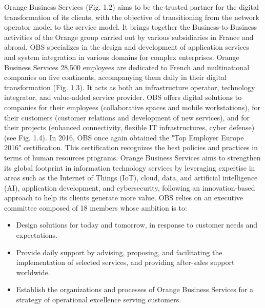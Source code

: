 Orange Business Services (Fig. 1.2) aims to be the trusted partner for the digital transformation of its clients, with the objective of transitioning from the network operator model to the service model. It brings together the Business-to-Business activities of the Orange group carried out by various subsidiaries in France and abroad. OBS specializes in the design and development of application services and system integration in various domains for complex enterprises. Orange Business Services 28,500 employees are dedicated to French and multinational companies on five continents, accompanying them daily in their digital transformation (Fig. 1.3). It acts as both an infrastructure operator, technology integrator, and value-added service provider. OBS offers digital solutions to companies for their employees (collaborative spaces and mobile workstations), for their customers (customer relations and development of new services), and for their projects (enhanced connectivity, flexible IT infrastructures, cyber defense) (see Fig. 1.4). In 2016, OBS once again obtained the "Top Employer Europe 2016" certification. This certification recognizes the best policies and practices in terms of human resources programs. Orange Business Services aims to strengthen its global footprint in information technology services by leveraging expertise in areas such as the Internet of Things (IoT), cloud, data, and artificial intelligence (AI), application development, and cybersecurity, following an innovation-based approach to help its clients generate more value.
\newpage
OBS relies on an executive committee composed of 18 members whose ambition is to:
\begin{itemize}
    \item Design solutions for today and tomorrow, in response to customer needs and expectations.
    \item Provide daily support by advising, proposing, and facilitating the implementation of selected services, and providing after-sales support worldwide.
    \item Establish the organizations and processes of Orange Business Services for a strategy of operational excellence serving customers.
\end{itemize}

